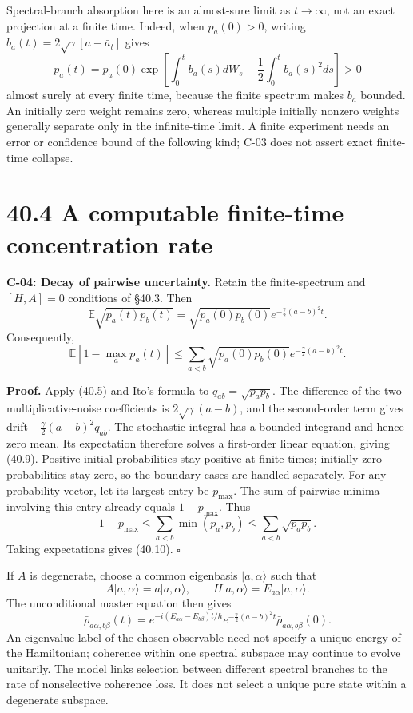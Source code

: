 \documentclass[
  11pt,
  oneside]{book}
\begin{document}
Spectral-branch absorption here is an almost-sure limit as
\(t\to\infty\), not an exact projection at a finite time. Indeed, when
\(p_a(0)>0\), writing \(b_a(t)=2\sqrt\gamma[a-\bar a_t]\) gives \[
p_a(t)=p_a(0)\exp\left[
\int_0^t b_a(s)dW_s-\frac12\int_0^t b_a(s)^2ds\right]>0
\] almost surely at every finite time, because the finite spectrum makes
\(b_a\) bounded. An initially zero weight remains zero, whereas multiple
initially nonzero weights generally separate only in the infinite-time
limit. A finite experiment needs an error or confidence bound of the
following kind; C-03 does not assert exact finite-time collapse.

\section{40.4 A computable finite-time concentration rate}

\label{c-04}{}

\textbf{C-04: Decay of pairwise uncertainty.} Retain the finite-spectrum
and \([H,A]=0\) conditions of §40.3. Then \[
\mathbb E\sqrt{p_a(t)p_b(t)}
=\sqrt{p_a(0)p_b(0)}
 e^{-\frac\gamma2(a-b)^2t}.
\tag{40.9}
\] Consequently, \[
\mathbb E[1-\max_a p_a(t)]
\le\sum_{a<b}\sqrt{p_a(0)p_b(0)}
 e^{-\frac\gamma2(a-b)^2t}.
\tag{40.10}
\]

\textbf{Proof.} Apply (40.5) and Itō's formula to
\(q_{ab}=\sqrt{p_ap_b}\). The difference of the two multiplicative-noise
coefficients is \(2\sqrt\gamma(a-b)\), and the second-order term gives
drift \(-\frac\gamma2(a-b)^2q_{ab}\). The stochastic integral has a
bounded integrand and hence zero mean. Its expectation therefore solves
a first-order linear equation, giving (40.9). Positive initial
probabilities stay positive at finite times; initially zero
probabilities stay zero, so the boundary cases are handled separately.
For any probability vector, let its largest entry be \(p_{\max}\). The
sum of pairwise minima involving this entry already equals
\(1-p_{\max}\). Thus \[
1-p_{\max}\le\sum_{a<b}\min(p_a,p_b)
\le\sum_{a<b}\sqrt{p_ap_b}.
\] Taking expectations gives (40.10). \(\square\)

If \(A\) is degenerate, choose a common eigenbasis \(|a,\alpha\rangle\)
such that \[
A|a,\alpha\rangle=a|a,\alpha\rangle,
\qquad H|a,\alpha\rangle=E_{a\alpha}|a,\alpha\rangle.
\] The unconditional master equation then gives \[
\bar\rho_{a\alpha,b\beta}(t)=
 e^{-i(E_{a\alpha}-E_{b\beta})t/\hbar}
 e^{-\frac\gamma2(a-b)^2t}
\bar\rho_{a\alpha,b\beta}(0).
\] An eigenvalue label of the chosen observable need not specify a
unique energy of the Hamiltonian; coherence within one spectral subspace
may continue to evolve unitarily. The model links selection between
different spectral branches to the rate of nonselective coherence loss.
It does not select a unique pure state within a degenerate subspace.
\end{document}
